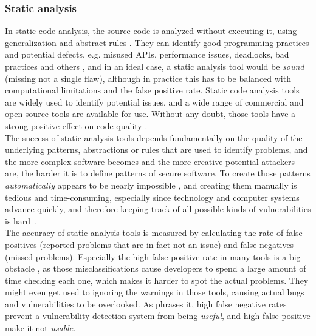 \documentclass[
	a4paper,
	pagesize,
	pdftex,
	12pt,
	twoside, %
	BCOR=5mm, %
	ngerman,
	fleqn,
	final,
	]{scrartcl}
\begin{document}
\subsubsection{Static analysis}
In static code analysis, the source code is analyzed without executing it, using generalization and abstract rules \cite{Ghaffarian.2017}. They can identify good programming practices and potential defects, e.g. misused APIs, performance issues, deadlocks, bad practices and others \cite{Venkatasubramanyam.2014}, and in an ideal case, a static analysis tool would be \textit{sound} (missing not a single flaw), although in practice this has to be balanced with computational limitations and the false positive rate. Static code analysis tools are widely used to identify potential issues, and a wide range of commercial and open-source tools are available for use. Without any doubt, those tools have a strong positive effect on code quality \cite{Liu.2018}. \\
The success of static analysis tools depends fundamentally on the quality of the underlying patterns, abstractions or rules that are used to identify problems, and the more complex software becomes and the more creative potential attackers are, the harder it is to define patterns of secure software. To create those patterns \textit{automatically} appears to be nearly impossible \cite{Rolim.2018, Yamaguchi.2012}, and creating them manually is tedious and time-consuming, especially since technology and computer systems advance quickly, and therefore keeping track of all possible kinds of vulnerabilities is hard~\cite{Ma.2017}.\\
The accuracy of static analysis tools is measured by calculating the rate of false positives (reported problems that are in fact not an issue) and false negatives (missed problems). Especially the high false positive rate in many tools is a big obstacle \cite[S.~1]{Liu.2018}, as those misclassifications cause developers to spend a large amount of time checking each one, which makes it harder to spot the actual problems. They might even get used to ignoring the warnings in those tools, causing actual bugs and vulnerabilities to be overlooked. As \cite{Li.2005} phrases it, high false negative rates prevent a vulnerability detection system from being \textit{useful}, and high false positive make it not \textit{usable}.\\
\end{document}
